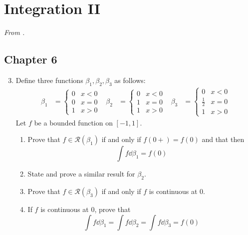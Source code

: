 \documentclass[../psets.tex]{subfiles}
\begin{document}
\section{Integration II}
\emph{From \textcite{bib:Rudin}.}
\subsection*{Chapter 6}
\begin{enumerate}[label={\textbf{\arabic*.}}]
    \setcounter{enumi}{2}
    \item {}Define three functions $\beta_1,\beta_2,\beta_3$ as follows:
    \begin{align*}
        \beta_1 &=
        \begin{cases}
            0 & x<0\\
            0 & x=0\\
            1 & x>0
        \end{cases}&
        \beta_2 &=
        \begin{cases}
            0 & x<0\\
            1 & x=0\\
            1 & x>0
        \end{cases}&
        \beta_3 &=
        \begin{cases}
            0 & x<0\\
            \tfrac{1}{2} & x=0\\
            1 & x>0
        \end{cases}
    \end{align*}
    Let $f$ be a bounded function on $[-1,1]$.
    \begin{enumerate}
        \item Prove that $f\in\mathscr{R}(\beta_1)$ if and only if $f(0+)=f(0)$ and that then
        \begin{equation*}
            \int f\dd{\beta_1} = f(0)
        \end{equation*}
        \item State and prove a similar result for $\beta_2$.
        \item Prove that $f\in\mathscr{R}(\beta_3)$ if and only if $f$ is continuous at 0.
        \item If $f$ is continuous at 0, prove that
        \begin{equation*}
            \int f\dd{\beta_1} = \int f\dd{\beta_2}
            = \int f\dd{\beta_3}
            = f(0)
        \end{equation*}
    \end{enumerate}

\end{enumerate}
\end{document}
